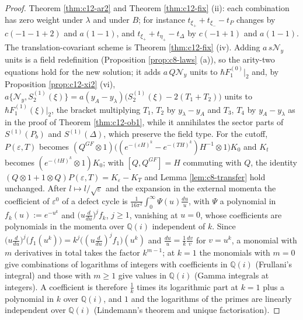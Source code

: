 \begin{proof}
Theorem \ref{thm:c12-ar2} and Theorem \ref{thm:c12-fix} (ii): each combination has zero weight under $\lambda$ and under $B$; for instance $t_{\xi_+}+t_{\xi_-}-t_P$ changes by $c(-1-1+2)$ and $a(1-1)$, and $t_{\xi_+}+t_{\eta_+}-t_\Delta$ by $c(-1+1)$ and $a(1-1)$. The translation-covariant scheme is Theorem \ref{thm:c12-fix} (iv). Adding $a\,s\mathcal N_y$ units is a field redefinition (Proposition \ref{prop:c8-laws} (a)), so the arity-two equations hold for the new solution; it adds $a\,Q\mathcal N_y$ units to $\hbar F_1^{(0)}|_2$ and, by Proposition \ref{prop:c12-xi2} (vi), $a\{\mathcal N_y,S^{(1)}_2(\xi)\}=a(y_A-y_\lambda)\big(S^{(1)}_2(\xi)-2(T_1+T_2)\big)$ units to $\hbar F_1^{(1)}(\xi)|_2$, the bracket multiplying $T_1$, $T_2$ by $y_\lambda-y_A$ and $T_3$, $T_4$ by $y_A-y_\lambda$ as in the proof of Theorem \ref{thm:c12-ob1}, while it annihilates the sector parts of $S^{(1)}(P_b)$ and $S^{(1)}(\Delta)$, which preserve the field type. For the cutoff, $P(\varepsilon,T)$ becomes $(Q^{GF}\otimes1)\big((e^{-(\varepsilon H)^k}-e^{-(TH)^k})H^{-1}\otimes1\big)K_0$ and $K_t$ becomes $(e^{-(tH)^k}\otimes1)K_0$; with $[Q,Q^{GF}]=H$ commuting with $Q$, the identity $(Q\otimes1+1\otimes Q)P(\varepsilon,T)=K_\varepsilon-K_T$ and Lemma \ref{lem:c8-transfer} hold unchanged. After $l\mapsto l/\sqrt\varepsilon$ and the expansion in the external momenta the coefficient of $\varepsilon^0$ of a defect cycle is $\frac1{16\pi^2}\int_0^\infty\Psi(u)\frac{du}u$, with $\Psi$ a polynomial in $f_k(u):=e^{-u^k}$ and $\big(u\tfrac d{du}\big)^jf_k$, $j\ge1$, vanishing at $u=0$, whose coefficients are polynomials in the momenta over $\mathbb Q(i)$ independent of $k$. Since $\big(u\tfrac d{du}\big)^j\big(f_1(u^k)\big)=k^j\big((u\tfrac d{du})^jf_1\big)(u^k)$ and $\frac{du}u=\frac1k\frac{dv}v$ for $v=u^k$, a monomial with $m$ derivatives in total takes the factor $k^{m-1}$; at $k=1$ the monomials with $m=0$ give combinations of logarithms of integers with coefficients in $\mathbb Q(i)$ (Frullani's integral) and those with $m\ge1$ give values in $\mathbb Q(i)$ (Gamma integrals at integers). A coefficient is therefore $\tfrac1k$ times its logarithmic part at $k=1$ plus a polynomial in $k$ over $\mathbb Q(i)$, and $1$ and the logarithms of the primes are linearly independent over $\mathbb Q(i)$ (Lindemann's theorem and unique factorisation).
\end{proof}

